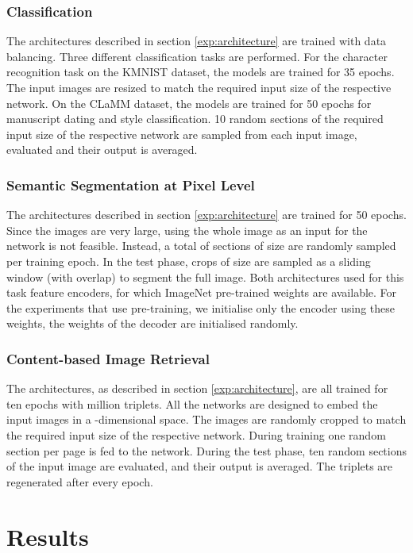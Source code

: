 \documentclass[journal]{IEEEtran}
\newcommand{\ls}[1]{{\color{black}#1}}
\newcommand{\vp}[1]{{\color{black}#1}}
\begin{document}
\subsubsection{Classification}
The architectures described in section \ref{exp:architecture} are trained with data balancing.
Three different classification tasks are performed. 
For the character recognition task on the \ac{KMNIST} dataset, the models are trained for 35 epochs. \ls{The input images are resized to match the required input size of the respective network.}
On the \ac{CLaMM} dataset, the models are trained for 50 epochs for manuscript dating and style classification.
\ls{10 random sections of the required input size of the respective network are sampled from each input image, evaluated and their output is averaged.}

\subsubsection{Semantic Segmentation at Pixel Level}
The architectures described in section \ref{exp:architecture} are trained for 50 epochs.
Since the images are very large, using the whole image as an input for the network is not feasible.
Instead, a total of  sections of size  are randomly sampled per training epoch. 
In the test phase, crops of size  are sampled as a sliding window (with  overlap) to segment the full image. 
Both architectures used for this task feature encoders, for which ImageNet pre-trained weights are available. 
For the experiments that use pre-training, we initialise only the encoder using these weights, the weights of the decoder are initialised randomly. 

\subsubsection{Content-based Image Retrieval}
The architectures, as described in section \ref{exp:architecture}, are all trained for ten epochs \vp{with  million triplets.} 
\vp{All the networks are designed to embed the input images in a -dimensional space.}
The images are randomly cropped to match the required input size of the respective network. 
During training one random section per page is fed to the network. During the test phase, ten random sections of the input image are evaluated, and their output is averaged.
The triplets are regenerated after every epoch.

 
\section{Results}
\label{toc:results}
\end{document}

